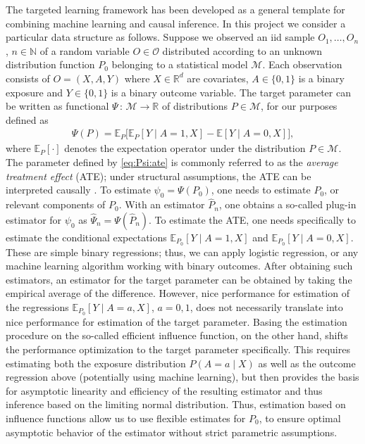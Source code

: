\documentclass{article}
\newcommand{\EE}{\mathbb{E}}
\newcommand{\R}{\mathbb{R}}
\newcommand{\1}{\mathbb{1}}
\begin{document}
The targeted learning framework has been developed as a general
template for combining machine learning and causal inference. In this
project we consider a particular data structure as follows. Suppose we
observed an iid sample \(O_1,\ldots,O_n\), \(n\in\mathbb{N}\) of a
random variable \(O \in\mathcal{O}\) distributed according to an
unknown distribution function \(P_0\) belonging to a statistical model
\(\mathcal{M}\). Each observation consists of \(O= (X, A, Y)\) where
\(X\in \R^d\) are covariates, \(A\in \lbrace 0,1\rbrace\) is a binary
exposure and \(Y\in\lbrace 0, 1\rbrace\) is a binary outcome
variable. The target parameter can be written as functional
\(\Psi \, : \, \mathcal{M} \rightarrow \R\) of distributions
\(P\in\mathcal{M}\), for our purposes defined as
\begin{align}
  \Psi( P ) = \EE_P \big[ \EE_P[ Y \mid A=1, X] - \EE[ Y\mid A=0,X]\big],
  \label{eq:Psi:ate}
\end{align}
where \(\EE_P[\cdot]\) denotes the expectation operator under the
distribution \(P\in \mathcal{M}\). The parameter defined by
\eqref{eq:Psi:ate} is commonly referred to as the \textit{average
  treatment effect} (ATE); under structural assumptions, the ATE can
be interpreted causally \citep{hernanrobins}.  To estimate
\(\psi_0 = \Psi(P_0)\), one needs to estimate \(P_0\), or relevant
components of \(P_0\).  With an estimator \(\hat{P}_n\), one obtains a
so-called plug-in estimator for \(\psi_0\) as
\(\hat{\Psi}_n = \Psi( \hat{P}_n)\). To estimate the ATE, one needs
specifically to estimate the conditional expectations
\(\EE_{P_0}[ Y \mid A=1, X]\) and \(\EE_{P_0}[ Y \mid A=0, X]\). These
are simple binary regressions; thus, we can apply logistic regression,
or any machine learning algorithm working with binary outcomes. After
obtaining such estimators, an estimator for the target parameter can
be obtained by taking the empirical average of the
difference. However, nice performance for estimation of the
regressions \(\EE_{P_0}[ Y \mid A=a, X]\), \(a=0,1\), does not
necessarily translate into nice performance for estimation of the
target parameter. Basing the estimation procedure on the so-called
efficient influence function, on the other hand, shifts the
performance optimization to the target parameter specifically. This
requires estimating both the exposure distribution \(P(A=a \mid X)\)
as well as the outcome regression above (potentially using machine
learning), but then provides the basis for asymptotic linearity and
efficiency of the resulting estimator and thus inference based on the
limiting normal distribution.  Thus, estimation based on influence
functions allow us to use flexible estimates for \(P_0\), to ensure
optimal asymptotic behavior of the estimator without strict parametric
assumptions.
\end{document}
